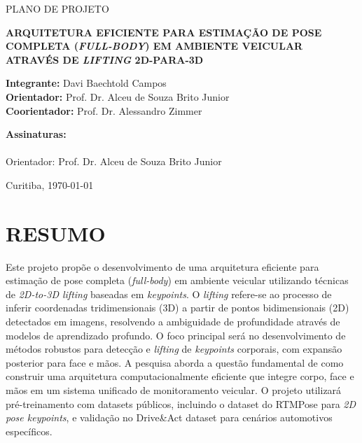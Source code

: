 \documentclass[12pt, a4paper]{article}
\begin{document}
\begin{titlepage}
    \centering
    {\large PLANO DE PROJETO \par}
    \vspace{1.5cm}
    {\bfseries\Large ARQUITETURA EFICIENTE PARA ESTIMAÇÃO DE POSE COMPLETA (\textit{FULL-BODY}) EM AMBIENTE VEICULAR ATRAVÉS DE \textit{LIFTING} 2D-PARA-3D \par}
    \vspace{2.5cm}

    \begin{flushleft}
        \textbf{Integrante:} Davi Baechtold Campos \\
        \textbf{Orientador:} Prof. Dr. Alceu de Souza Brito Junior \\
        \textbf{Coorientador:} Prof. Dr. Alessandro Zimmer
    \end{flushleft}

    \vfill
    \begin{flushleft}
        \textbf{Assinaturas:}\\[1.4cm]
        \makebox[9cm]{\hrulefill}\\
        \small Orientador: Prof. Dr. Alceu de Souza Brito Junior 
    \end{flushleft}

    \vfill
    {\large Curitiba, \today \par}
\end{titlepage}

\tableofcontents
\newpage
\setcounter{page}{1}

\section{RESUMO}
Este projeto propõe o desenvolvimento de uma arquitetura eficiente para
estimação de pose completa (\textit{full-body}) em ambiente veicular utilizando
técnicas de \textit{2D-to-3D lifting} baseadas em \textit{keypoints}. O
\textit{lifting} refere-se ao processo de inferir coordenadas tridimensionais
(3D) a partir de pontos bidimensionais (2D) detectados em imagens, resolvendo a
ambiguidade de profundidade através de modelos de aprendizado profundo. O foco
principal será no desenvolvimento de métodos robustos para detecção e
\textit{lifting} de \textit{keypoints} corporais, com expansão posterior para
face e mãos. A pesquisa aborda a questão fundamental de como construir uma
arquitetura computacionalmente eficiente que integre corpo, face e mãos em um
sistema unificado de monitoramento veicular. O projeto utilizará
pré-treinamento com datasets públicos, incluindo o dataset do RTMPose para
\textit{2D pose keypoints}, e validação no Drive\&Act dataset para cenários
automotivos específicos.
\end{document}
